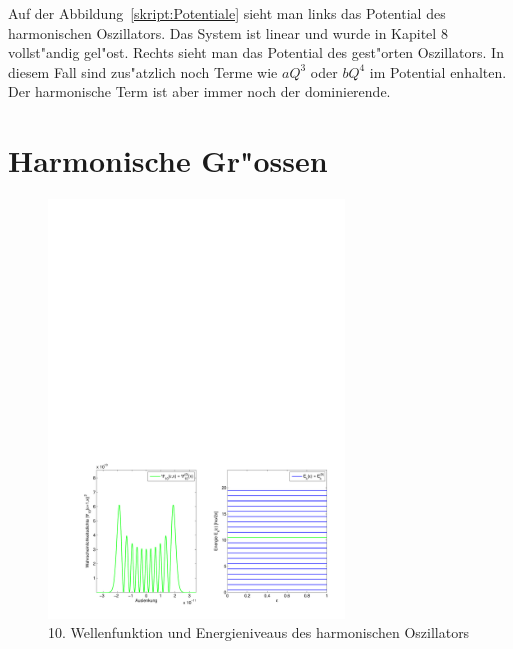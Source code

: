 \begin{refsection}
Auf der Abbildung~\ref{skript:Potentiale} sieht man links das Potential des harmonischen Oszillators. Das System ist linear und wurde in Kapitel 8 vollst"andig gel"ost. Rechts sieht man das Potential des gest"orten Oszillators. In diesem Fall sind zus"atzlich noch Terme wie $aQ^3$ oder $bQ^4$ im Potential enhalten. Der harmonische Term ist aber immer noch der dominierende.

\section{Harmonische Gr"ossen}

\begin{figure}[h]	%
\centering
\includegraphics[width=0.7\textwidth]{anharmonisch/images/Harmonisch.pdf}
\caption{10. Wellenfunktion und Energieniveaus des harmonischen Oszillators
\label{skript:Harmonisch}}
\end{figure}


\end{refsection}
